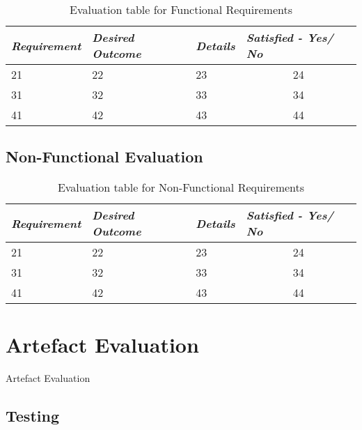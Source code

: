 \begin{table}[H]
    \centering
    \begin{tabular}{llll}
    \hline
    \multicolumn{1}{|l|}{\textit{\textbf{Requirement}}} & \multicolumn{1}{l|}{\textit{\textbf{Desired Outcome}}} & \multicolumn{1}{l|}{\textit{\textbf{Details}}} & \multicolumn{1}{l|}{\textit{\textbf{Satisfied - Yes/ No}}} \\ \hline
    21 & 22 & 23 & \multicolumn{1}{c|}{24} \\
    31 & 32 & 33 & \multicolumn{1}{c|}{34} \\
    41 & 42 & 43 & \multicolumn{1}{c|}{44} \\ \hline
    \end{tabular}
    \caption{Evaluation table for Functional Requirements}
    \label{tab:EvaluationFunctionalRequirements}
\end{table}

\subsection{Non-Functional Evaluation}

\begin{table}[H]
    \centering
    \begin{tabular}{llll}
    \hline
    \multicolumn{1}{|l|}{\textit{\textbf{Requirement}}} & \multicolumn{1}{l|}{\textit{\textbf{Desired Outcome}}} & \multicolumn{1}{l|}{\textit{\textbf{Details}}} & \multicolumn{1}{l|}{\textit{\textbf{Satisfied - Yes/ No}}} \\ \hline
    21 & 22 & 23 & \multicolumn{1}{c|}{24} \\
    31 & 32 & 33 & \multicolumn{1}{c|}{34} \\
    41 & 42 & 43 & \multicolumn{1}{c|}{44} \\ \hline
    \end{tabular}
    \caption{Evaluation table for Non-Functional Requirements}
    \label{tab:EvaluationNonFunctionalRequirements}
\end{table}

\section{Artefact Evaluation}

Artefact Evaluation

\subsection{Testing}



